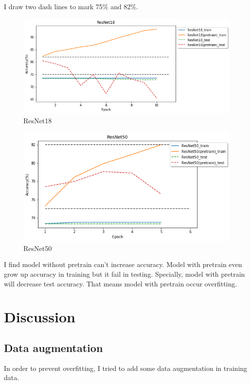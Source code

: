 \documentclass[12pt]{article}
\begin{document}
I draw two dash lines to mark 75\% and 82\%.

\begin{figure}[H]
\centering
\includegraphics[width=\linewidth]{Images/ResNet18.png}
\caption{ResNet18}
\end{figure}

\begin{figure}[H]
\centering
\includegraphics[width=\linewidth]{Images/ResNet50.png} 
\caption{ResNet50}
\end{figure}

I find model without pretrain can't increase accuracy. Model with pretrain even grow up accuracy in training but it fail in testing. Specially, model with pretrain will decrease test accuracy. That means model with pretrain occur overfitting.

\section{Discussion}

\subsection{Data augmentation}

In order to prevent overfitting, I tried to add some data augmentation in training data.
\end{document}
